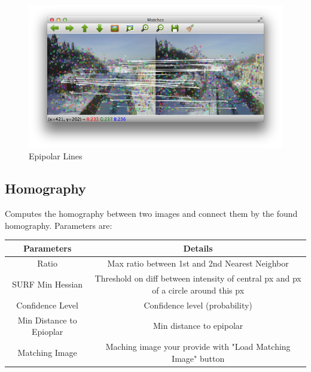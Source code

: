 \documentclass{article}
\begin{document}
\begin{figure}[H]
\begin{center}
\includegraphics[scale=0.5]{toolboxEpipolarLines.png}
\caption{Epipolar Lines}
\end{center}
\end{figure}	   


\subsection{Homography}
Computes the homography between two images and connect them by the found homography. Parameters are:

	\begin{table}[H]
\begin{center}
\begin{tabular}{|c|c|l|l|l|}
\hline
\textbf{Parameters}      & \multicolumn{4}{|c|}{\textbf{Details}}                                                                    \\ \hline
Ratio                    & \multicolumn{4}{|c|}{Max ratio between 1st and 2nd Nearest Neighbor}                                      \\ \hline
SURF Min Hessian         & \multicolumn{4}{|c|}{Threshold on diff between intensity of central px and px of a circle around this px} \\ \hline
Confidence Level         & \multicolumn{4}{|c|}{Confidence level (probability)}                                                      \\ \hline
Min Distance to Epioplar & \multicolumn{4}{|c|}{Min distance to epipolar}                                                            \\ \hline
Matching Image           & \multicolumn{4}{|c|}{Maching image your provide with "Load Matching Image" button}                        \\ \hline
\end{tabular}
\end{center}
\end{table}
\end{document}
